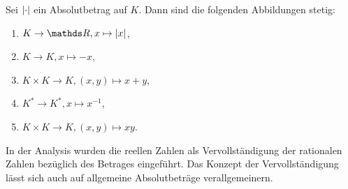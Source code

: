 \begin{satz}
Sei $\left\vert\cdot\right\vert$ ein Absolutbetrag auf $K$. Dann sind die folgenden Abbildungen stetig:
\begin{enumerate}[label=\roman*)]
\item $K\to \R, x \mapsto \abs{x}$,
\item $K\to K, x\mapsto -x$,
\item $K \times K \to K, (x,y)\mapsto x+y$,
\item $K^\ast \to K^\ast, x \mapsto x^{-1}$,
\item $K \times K \to K, (x,y)\mapsto xy$.
\end{enumerate}
\end{satz}

In der Analysis wurden die reellen Zahlen als Vervollständigung der rationalen Zahlen bezüglich des Betrages eingeführt.
Das Konzept der Vervollständigung lässt sich auch auf allgemeine Absolutbeträge verallgemeinern.


